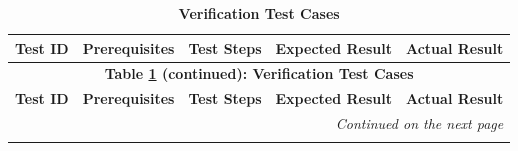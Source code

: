 \documentclass[]{final_report}
\theoremstyle{definition}
\begin{document}
\begin{longtable}{|p{1.2cm}|p{3cm}|p{3cm}|p{4cm}|p{4cm}|}
  \caption{\textbf{Verification Test Cases}} \label{tab:verification_test_cases} \\
  \hline
  \textbf{Test ID} & \textbf{Prerequisites} & \textbf{Test Steps} & \textbf{Expected Result} & \textbf{Actual Result} \\
  \hline
  \endfirsthead

  \multicolumn{5}{c}{\textbf{Table \ref{tab:verification_test_cases} (continued): Verification Test Cases}} \\
  \hline
  \textbf{Test ID} & \textbf{Prerequisites} & \textbf{Test Steps} & \textbf{Expected Result} & \textbf{Actual Result} \\
  \hline
  \endhead

  \hline
  \multicolumn{5}{r}{\textit{Continued on the next page}} \\
  \endfoot

  \hline
  \endlastfoot


\end{longtable}
\end{document}
